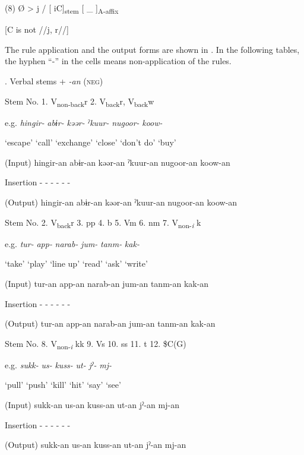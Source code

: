 (8)  Ø  >  j  /  [   iC]\textsubscript{stem}  [ \_   ]\textsubscript{A-affix}

          [C is not //j, r//]  

The rule application and the output forms are shown in . In the following tables, the hyphen “-” in the cells means non-application of the rules.

\begin{styleBeschriftung}
\textmd{}\textmd{. Verbal stems +} \textmd{\textit{{}-an}}\textmd{ (\textsc{neg})}
\end{styleBeschriftung}

Stem No.  1. V\textsubscript{non-back}r  2. V\textsubscript{back}r, V\textsubscript{back}w

e.g.  \textit{hingir-}  \textit{abɨr-}  \textit{kəər-}  \textit{ˀkuur-}  \textit{nugoor-}  \textit{koow-}

  ‘escape’  ‘call’  ‘exchange’  ‘close’  ‘don’t do’  ‘buy’

(Input)  hingir-an  abɨr-an  kəər-an  ˀkuur-an  nugoor-an  koow-an

Insertion  {}-  {}-  {}-  {}-  {}-  {}-

(Output)  hingir-an  abɨr-an  kəər-an  ˀkuur-an  nugoor-an  koow-an

Stem No.  2. V\textsubscript{back}r  3. pp  4. b  5. Vm  6. nm  7. V\textsubscript{non-}\textit{\textsubscript{i} }k

e.g.  \textit{tur-}  \textit{app-}  \textit{narab-}  \textit{jum-}  \textit{tanm-}  \textit{kak-}

  ‘take’  ‘play’  ‘line up’  ‘read’  ‘ask’  ‘write’

(Input)  tur-an  app-an  narab-an  jum-an  tanm-an  kak-an

Insertion  {}-  {}-  {}-  {}-  {}-  {}-

(Output)  tur-an  app-an  narab-an  jum-an  tanm-an  kak-an

Stem No.  8. V\textsubscript{non-}\textit{\textsubscript{i} }kk  9. Vs  10. ss  11. t  12. \$C(G)

e.g.  \textit{sukk-}  \textit{us-}  \textit{kuss-}  \textit{ut-}  \textit{jˀ-}  \textit{mj-}

  ‘pull’  ‘push’  ‘kill’  ‘hit’  ‘say’  ‘see’

(Input)  sukk-an  us-an  kuss-an  ut-an  jˀ-an  mj-an

Insertion  {}-  {}-  {}-  {}-  {}-  {}-

(Output)  sukk-an  us-an  kuss-an  ut-an  jˀ-an  mj-an


